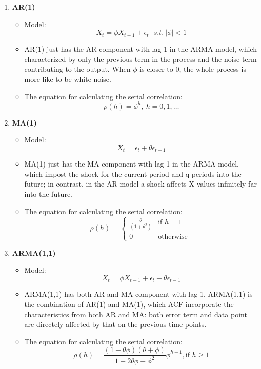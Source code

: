 \documentclass[11pt]{article}
\begin{document}
\begin{enumerate}
\item \textbf{AR(1)}
\begin{itemize}
\item Model:
\begin{equation}
X_t = \phi X_{t-1} + \epsilon_t \ \ \  s.t.\ |\phi | < 1
\end{equation}
\item AR(1) just has the AR component with lag 1 in the ARMA model, which characterized by only the previous term in the process and the noise term contributing to the output. When $\phi$ is closer to 0, the whole process is more like to be white noise.
\item The equation for calculating the serial correlation:
\begin{equation}
\rho(h) = \phi ^h, \ h = 0,1,\dots
\end{equation}
\end{itemize}

\item \textbf{MA(1)}
\begin{itemize}
\item Model:
\begin{equation}
X_t = \epsilon_t + \theta\epsilon_{t-1}
\end{equation}
\item MA(1) just has the MA component with lag 1 in the ARMA model, which impost the shock for the current period and q periods into the future; in contrast, in the AR model a shock affects  X values infinitely far into the future.
\item The equation for calculating the serial correlation:
\begin{equation}
\rho(h) = \begin{cases} \frac{\theta}{(1+\theta^2)} &\mbox{if } h = 1 \\ 
0 & \mbox{otherwise } \end{cases}
\end{equation}
\end{itemize}

\item \textbf{ARMA(1,1)}
\begin{itemize}
\item Model:
\begin{equation}
X_t = \phi X_{t-1} + \epsilon_t + \theta\epsilon_{t-1}
\end{equation}
\item ARMA(1,1) has both AR and MA component with lag 1. ARMA(1,1) is the combination of AR(1) and MA(1), which ACF incorporate the characteristics from both AR and MA: both error term and data point are directely affected by that on the previous time points.
\item The equation for calculating the serial correlation:
\begin{equation}
\rho(h) = \frac{(1+\theta \phi)(\theta + \phi)}{1+ 2\theta \phi +\phi^2} \phi^{h-1}, \mbox{if } h \geq 1
\end{equation}
\end{itemize}
\end{enumerate}
\end{document}
